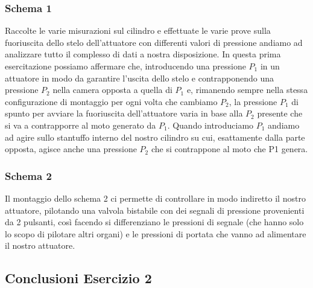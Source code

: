 \documentclass[a4paper]{article}
\begin{document}
\subsubsection{Schema 1}
Raccolte le varie misurazioni sul cilindro e effettuate le varie prove sulla fuoriuscita dello stelo dell’attuatore con differenti valori di pressione andiamo ad analizzare tutto il complesso di dati a nostra disposizione.
In questa prima esercitazione possiamo affermare che, introducendo una pressione $P_1$ in un attuatore in modo da garantire l’uscita dello stelo e contrapponendo una pressione $P_2$ nella camera opposta a quella di $P_1$ e, rimanendo sempre nella stessa configurazione di montaggio per ogni volta che cambiamo $P_2$, la pressione $P_1$ di spunto per avviare la fuoriuscita dell’attuatore varia in base alla $P_2$ presente che si va a contrapporre al moto generato da $P_1$. 
Quando introduciamo $P_1$ andiamo ad agire sullo stantuffo interno del nostro cilindro su cui, esattamente dalla parte opposta, agisce anche una pressione $P_2$ che si contrappone al moto che P1 genera. 

\subsubsection{Schema 2}
Il montaggio dello schema 2 ci permette di controllare in modo indiretto il nostro attuatore, pilotando una valvola bistabile con dei segnali di pressione provenienti da 2 pulsanti, così facendo si differenziano le pressioni di segnale (che hanno solo lo scopo di pilotare altri organi) e le pressioni di portata che vanno ad alimentare il nostro attuatore.

\subsection{Conclusioni Esercizio 2}
\end{document}
